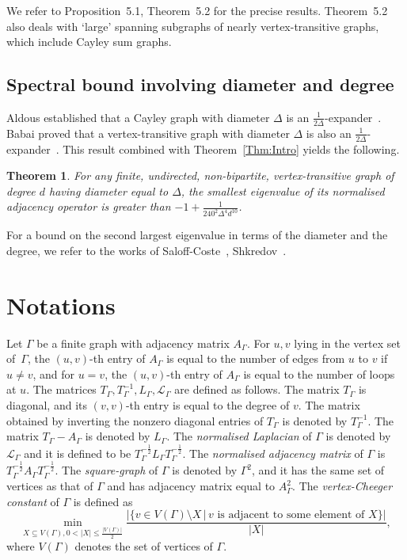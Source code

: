 \documentclass[10pt]{article}
\newtheorem{theorem}{Theorem}[section]
\theoremstyle{definition}
\newcommand{\mo}{{-1}}
\newcommand{\calL}{\ensuremath{\mathcal{L}}}
\begin{document}
We refer to Proposition~\textup{5.1}, Theorem~\textup{5.2} for the precise results. Theorem~\textup{5.2} also deals with `large' spanning subgraphs of nearly vertex-transitive graphs, which include Cayley sum graphs. 

\subsection{Spectral bound involving diameter and degree}

Aldous established that a Cayley graph with diameter $\Delta$ is an $\frac 1{2\Delta}$-expander~\cite[Lemma 3.1]{AldousMarkovChainSimulation}. Babai proved that a vertex-transitive graph with diameter $\Delta$ is also an $\frac 1 {2\Delta}$-expander~\cite[Proposition 3.5]{BabaiLocalExpansionVertexTransitive}. This result combined with Theorem~\ref{Thm:Intro} yields the following. 

\begin{theorem}
\label{Thm:IntroDiam}
For any finite, undirected, non-bipartite, vertex-transitive graph of degree $d$ having diameter equal to $\Delta$, the smallest eigenvalue of its normalised adjacency operator is greater than $-1 + \frac{1}{240^2 \Delta^4 d^{10}}$.
\end{theorem}

For a bound on the second largest eigenvalue in terms of the diameter and the degree, we refer to the works of Saloff-Coste~\cite[Corollary 3.2.7]{SaloffCosteLectureFiniteMarkovChain}, Shkredov~\cite{ShkredovSpectralGapDiamCayley}.


\section{Notations}
Let $\Gamma$ be a finite graph with adjacency matrix $A_\Gamma$. 
For $u, v$ lying in the vertex set of~$\Gamma$, the $(u,v)$-th entry of $A_\Gamma$ is equal to the number of edges from $u$ to $v$ if $u\neq v$, and  for $u = v$, the $(u,v)$-th entry of $A_\Gamma$ is equal to the number of loops at $u$. The matrices $T_\Gamma, T_\Gamma^\mo, L_\Gamma, \calL_\Gamma$ are defined as follows. The matrix $T_\Gamma$ is diagonal, and its $(v, v)$-th entry is equal to the degree of $v$. The matrix obtained by inverting the nonzero diagonal entries of $T_\Gamma$ is denoted by $T_\Gamma^\mo$. The matrix $T_\Gamma - A_\Gamma$ is denoted by $L_\Gamma$. The \textit{normalised Laplacian} of $\Gamma$ is denoted by $\calL_\Gamma$ and it is defined to be $T_\Gamma^{-\frac 12} L_\Gamma T_\Gamma^{- \frac 12}$. The \textit{normalised adjacency matrix} of $\Gamma$ is $T_\Gamma^{-\frac 12} A_\Gamma T_\Gamma^{- \frac 12}$. The \textit{square-graph} of $\Gamma$ is denoted by $\Gamma^2$, and it has the same set of vertices as that of $\Gamma$ and has adjacency matrix equal to $A_\Gamma^2$. The \textit{vertex-Cheeger constant} of $\Gamma$ is defined as 
$$\min_{X\subseteq V(\Gamma), 0 < |X| \leq \frac{|V(\Gamma)|}2}
\frac{|\{v\in V(\Gamma) \setminus X\,|\, v \text{ is adjacent to some element of } X\}|}{|X|}
,$$
where $V(\Gamma)$ denotes the set of vertices of $\Gamma$. 
\end{document}

